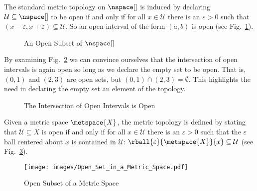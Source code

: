 \documentclass[oneside]{book}                                                  %
\begin{document}
                \begin{example}
                    The standard metric topology on $\nspace[]$ is induced by
                    declaring $\mathcal{U}\subseteq\nspace[]$ to be open if and
                    only if for all $x\in\mathcal{U}$ there is an
                    $\varepsilon>0$ such that
                    $(x-\varepsilon,x+\varepsilon)\subseteq\mathcal{U}$. So an
                    open interval of the form $(a,b)$ is open
                    (see Fig.~\ref{fig:Open_Subset_of_R}).
                \end{example}
                \begin{figure}[H]
                    \centering
                    \captionsetup{type=figure}
                    
                    \caption{An Open Subset of $\nspace[]$}
                    \label{fig:Open_Subset_of_R}
                \end{figure}
                By examining Fig.~\ref{fig:Open_Interval_Intersect_is_Open} we
                can convince ourselves that the intersection of open intervals
                is again open so long as we declare the empty set to be open.
                That is, $(0,1)$ and $(2,3)$ are open sets, but
                $(0,1)\cap(2,3)=\emptyset$. This highlights the need in
                declaring the empty set an element of the topology.
                \begin{figure}[H]
                    \centering
                    \captionsetup{type=figure}
                    
                    \caption{The Intersection of Open Intervals is Open}
                    \label{fig:Open_Interval_Intersect_is_Open}
                \end{figure}
                \begin{example}
                    Given a metric space $\metspace{X}$, the metric topology is
                    defined by stating that $\mathcal{U}\subseteq{X}$ is open if
                    and only if for all $x\in\mathcal{U}$ there is an
                    $\varepsilon>0$ such that the $\varepsilon$ ball centered
                    about $x$ is contained in $\mathcal{U}$:
                    $\rball{\varepsilon}{\metspace{X}}{x}\subseteq\mathcal{U}$
                    (see Fig.~\ref{fig:Open_Subset_Metric_Space}).
                \end{example}
                \begin{figure}[H]
                    \centering
                    \captionsetup{type=figure}
                    \texttt{[image: images/Open\_Set\_in\_a\_Metric\_Space.pdf]}
                    \caption{Open Subset of a Metric Space}
                    \label{fig:Open_Subset_Metric_Space}
                \end{figure}
\end{document}
